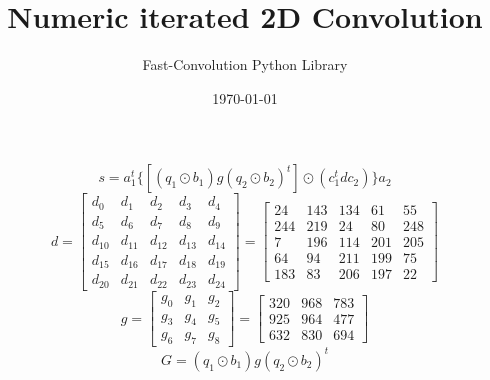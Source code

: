 \documentclass{article}%
\title{Numeric iterated 2D Convolution}%
\author{Fast{-}Convolution Python Library}%
\date{\today}%
\begin{document}
%
\normalsize%
\maketitle%
\[%
s=a_1^t \{[(q_1 \odot b_1) g (q_2 \odot b_2)^t] \odot (c_1^t d c_2)\}a_2%
\]%
\[%
d = \left[\begin{matrix}d_{0} & d_{1} & d_{2} & d_{3} & d_{4}\\d_{5} & d_{6} & d_{7} & d_{8} & d_{9}\\d_{10} & d_{11} & d_{12} & d_{13} & d_{14}\\d_{15} & d_{16} & d_{17} & d_{18} & d_{19}\\d_{20} & d_{21} & d_{22} & d_{23} & d_{24}\end{matrix}\right] = \left[\begin{matrix}24 & 143 & 134 & 61 & 55\\244 & 219 & 24 & 80 & 248\\7 & 196 & 114 & 201 & 205\\64 & 94 & 211 & 199 & 75\\183 & 83 & 206 & 197 & 22\end{matrix}\right]%
\]%
\[%
g = \left[\begin{matrix}g_{0} & g_{1} & g_{2}\\g_{3} & g_{4} & g_{5}\\g_{6} & g_{7} & g_{8}\end{matrix}\right] = \left[\begin{matrix}320 & 968 & 783\\925 & 964 & 477\\632 & 830 & 694\end{matrix}\right]%
\]%
\[%
G = (q_1 \odot b_1) g (q_2 \odot b_2)^t%
\]%
\end{document}
